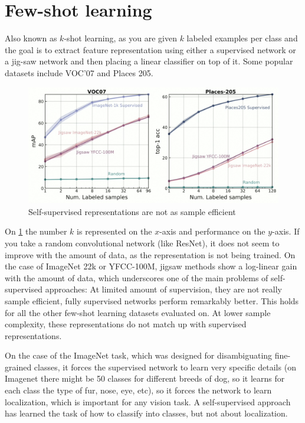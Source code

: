 \section{Few-shot learning}

Also known as $k$-shot learning, as you are given $k$ labeled examples per class and the goal is to extract feature representation using either a supervised network or a jig-saw network and then placing a linear classifier on top of it. Some popular datasets include VOC’07 and Places 205.

\begin{figure}[H]
\centering
\includegraphics[width=0.8\linewidth]{lectures/13-b/graphics/Self_supervised.png}
\caption{Self-supervised representations are not as sample efficient}\label{fig:Self_supervised}
\end{figure}



On \ref{fig:Self_supervised} the number $k$ is represented on the $x$-axis and performance on the $y$-axis. If you take a random convolutional network (like ResNet), it does not seem to improve with the amount of data, as the representation is not being trained. On the case of ImageNet 22k or YFCC-100M, jigsaw methods show a log-linear gain with the amount of data, which underscores one of the main problems of self-supervised approaches: At limited amount of supervision, they are not really sample efficient, fully supervised networks perform remarkably better. This holds for all the other few-shot learning datasets evaluated on. At lower sample complexity, these representations do not match up with supervised representations.

On the case of the ImageNet task, which was designed for disambiguating fine-grained classes, it forces the supervised network to learn very specific details (on Imagenet there might be 50 classes for different breeds of dog, so it learns for each class the type of fur, nose, eye, etc), so it forces the network to learn localization, which is important for any vision task. A self-supervised approach has learned the task of how to classify into classes, but not about localization.

